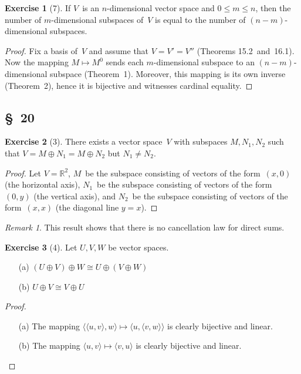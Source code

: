 \documentclass[letterpaper,12pt]{article}
\newcommand{\R}{\mathbb{R}}
\newcommand{\iso}{\cong}
\newcommand{\dsum}{\oplus}
\newcommand{\pair}[2]{\langle{#1},{#2}\rangle}
\theoremstyle{definition}
\newtheorem*{exer}{Exercise}
\theoremstyle{remark}
\newtheorem*{rmk}{Remark}
\theoremstyle{direction}
\begin{document}
\begin{exer}[7]
If \(V\)~is an \(n\)-dimensional vector space and \(0\le m\le n\), then the number of \(m\)-dimensional subspaces of~\(V\) is equal to the number of \((n-m)\)-dimensional subspaces.
\end{exer}
\begin{proof}
Fix a basis of~\(V\) and assume that \(V=V'=V''\) (Theorems 15.2~and~16.1). Now the mapping \(M\mapsto M^0\) sends each \(m\)-dimensional subspace to an \((n-m)\)-dimensional subspace (Theorem~1). Moreover, this mapping is its own inverse (Theorem~2), hence it is bijective and witnesses cardinal equality.
\end{proof}

\subsection*{\S~20}
\begin{exer}[3]
There exists a vector space~\(V\) with subspaces \(M,N_1,N_2\) such that \(V=M\dsum N_1=M\dsum N_2\) but \(N_1\ne N_2\).
\end{exer}
\begin{proof}
Let \(V=\R^2\), \(M\)~be the subspace consisting of vectors of the form~\((x,0)\) (the horizontal axis), \(N_1\)~be the subspace consisting of vectors of the form~\((0,y)\) (the vertical axis), and \(N_2\)~be the subspace consisting of vectors of the form~\((x,x)\) (the diagonal line \(y=x\)).
\end{proof}
\begin{rmk}
This result shows that there is no cancellation law for direct sums.
\end{rmk}

\begin{exer}[4]
Let \(U,V,W\) be vector spaces.
\begin{enumerate}
\item[(a)] \((U\dsum V)\dsum W\iso U\dsum(V\dsum W)\)
\item[(b)] \(U\dsum V\iso V\dsum U\)
\end{enumerate}
\end{exer}
\begin{proof}\
\begin{enumerate}
\item[(a)] The mapping \(\pair{\pair{u}{v}}{w}\mapsto\pair{u}{\pair{v}{w}}\) is clearly bijective and linear.
\item[(b)] The mapping \(\pair{u}{v}\mapsto\pair{v}{u}\) is clearly bijective and linear.\qedhere
\end{enumerate}
\end{proof}
\end{document}
